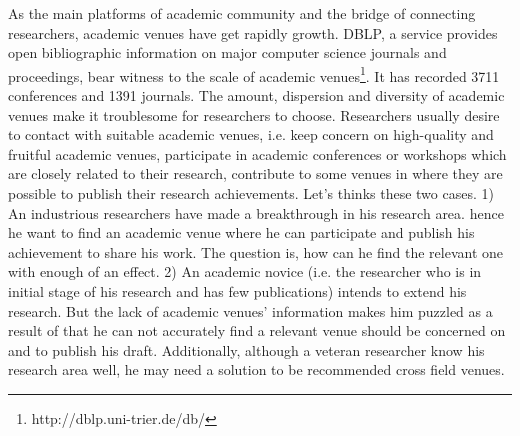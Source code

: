 \documentclass[9pt]{acm_proc_article-sp}
\begin{document}
As the main platforms of academic community and the bridge of connecting researchers, academic venues have get rapidly growth. DBLP, a service provides open bibliographic information on major computer science journals and proceedings, bear witness to the scale of academic venues\footnote{http://dblp.uni-trier.de/db/}. It has recorded 3711 conferences and 1391 journals. The amount, dispersion and diversity of academic venues make it troublesome for researchers to choose. Researchers usually desire to contact with suitable academic venues, i.e. keep concern on high-quality and fruitful academic venues, participate in academic conferences or workshops which are closely related to their research, contribute to some venues in where they are possible to publish their research achievements. Let's thinks these two cases. 1) An industrious researchers have made a breakthrough in his research area. hence he want to find an academic venue where he can participate and publish his achievement to share his work. The question is, how can he find the relevant one with enough of an effect. 2) An academic novice (i.e. the researcher who is in initial stage of his research and has few publications) intends to extend his research. But the lack of academic venues' information makes him puzzled as a result of that he can not accurately find a relevant venue should be concerned on and to publish his draft. Additionally, although a veteran researcher know his research area well, he may need a solution to be recommended cross field venues.
\end{document}

